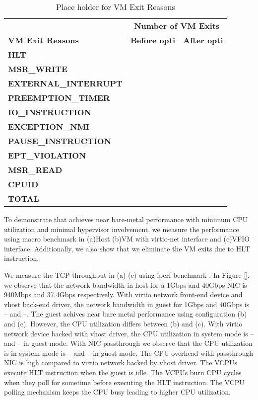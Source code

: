 

\begin{table}
\begin{tabular}{|p{4cm}|p{1.8cm}|p{1.8cm}|} \hline
 & \multicolumn{2}{|c|}{\textbf{Number of VM Exits}} \\ \cline{2-3} 
\textbf{VM Exit Reasons}& \textbf{Before \linebreak opti} & \textbf{After \linebreak opti}\\ %
\textbf{HLT} & &\\ \hline
\textbf{MSR\_WRITE} & &\\ \hline
\textbf{EXTERNAL\_INTERRUPT} & &\\ \hline
\textbf{PREEMPTION\_TIMER} & &\\ \hline
\textbf{IO\_INSTRUCTION} & &\\ \hline
\textbf{EXCEPTION\_NMI} & &\\ \hline
\textbf{PAUSE\_INSTRUCTION} & &\\ \hline
\textbf{EPT\_VIOLATION} & &\\ \hline
\textbf{MSR\_READ} & &\\ \hline
\textbf{CPUID} & &\\ \hline
\textbf{TOTAL} &  &\\ \hline
\end{tabular}
\vspace{6pt}
\caption{Place holder for VM Exit Reasons}
\label{VM Exit Reasons}
\end{table}

To demonstrate that \na achieves near bare-metal 
performance with minimum CPU utilization and minimal
hypervisor involvement, we measure the performance using
macro benchmark in (a)Host (b)VM with virtio-net
interface and (c)VFIO interface. Additionally, we
also show that we eliminate the VM exits due to 
HLT instruction.

We measure the TCP throughput in (a)-(c) using iperf
benchmark \cite{}. In Figure \ref{}, we observe that the
network bandwidth in host for a 1Gbps and 40Gbps NIC
is 940Mbps and 37.4Gbps respectively. With virtio network
front-end device and vhost back-end driver, the network
bandwidth in guest for 1Gbps and 40Gbps is -- and --. The
guest achives near bare metal performance using 
configuration (b) and (c). However, the CPU
utilization differs between (b) and (c). With virtio
network device backed with vhost driver, the CPU 
utilization in system mode is -- and -- in guest mode.
With NIC passthrough we observe that the CPU utilization 
is in system mode is -- and -- in guest mode. The CPU 
overhead with passthrough NIC is high compared to 
virtio network backed by vhost driver.
The VCPUs execute HLT instruction when the guest is idle.
The VCPUs burn CPU cycles when they poll for sometime
before executing the HLT instruction. The VCPU polling
mechanism keeps the CPU busy leading to higher CPU 
utilization.

